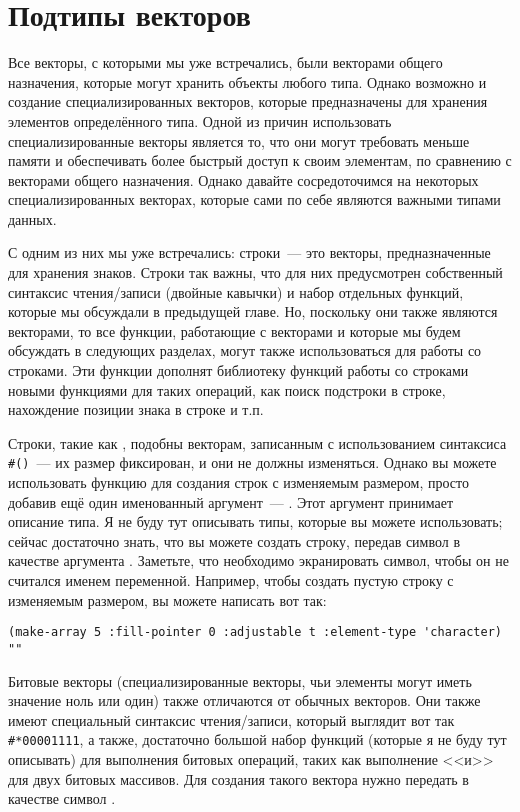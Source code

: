 \section{Подтипы векторов}

Все векторы, с которыми мы уже встречались, были векторами общего назначения, которые
могут хранить объекты любого типа.  Однако возможно и создание специализированных
векторов, которые предназначены для хранения элементов определённого типа.  Одной из
причин использовать специализированные векторы является то, что они могут требовать
меньше памяти и обеспечивать более быстрый доступ к своим элементам, по сравнению с
векторами общего назначения.  Однако давайте сосредоточимся на некоторых
специализированных векторах, которые сами по себе являются важными типами данных.

С одним из них мы уже встречались: строки~--- это векторы, предназначенные для хранения
знаков.  Строки так важны, что для них предусмотрен собственный синтаксис чтения/записи
(двойные кавычки) и набор отдельных функций, которые мы обсуждали в предыдущей главе.  Но,
поскольку они также являются векторами, то все функции, работающие с векторами и которые мы
будем обсуждать в следующих разделах, могут также использоваться для работы со строками.
Эти функции дополнят библиотеку функций работы со строками новыми функциями для таких
операций, как поиск подстроки в строке, нахождение позиции знака в строке и т.п.

Строки, такие как , подобны векторам, записанным с использованием синтаксиса
\lstinline!#()!~--- их размер фиксирован, и они не должны изменяться.  Однако вы можете
использовать функцию  для создания строк с изменяемым размером, просто
добавив ещё один именованный аргумент~--- .  Этот аргумент принимает
описание типа.  Я не буду тут описывать типы, которые вы можете использовать; сейчас
достаточно знать, что вы можете создать строку, передав символ  в
качестве аргумента .  Заметьте, что необходимо экранировать
символ, чтобы он не считался именем переменной.  Например, чтобы создать пустую строку с
изменяемым размером, вы можете написать вот так:

\begin{lstlisting}[style=lisprepl]
  (make-array 5 :fill-pointer 0 :adjustable t :element-type 'character)  ""
\end{lstlisting}

Битовые векторы (специализированные векторы, чьи элементы могут иметь значение ноль или
один) также отличаются от обычных векторов.  Они также имеют специальный синтаксис
чтения/записи, который выглядит вот так \lstinline!#*00001111!, а также, достаточно большой
набор функций (которые я не буду тут описывать) для выполнения битовых операций, таких как
выполнение <<и>> для двух битовых массивов.  Для создания такого вектора нужно передать
в качестве  символ .


